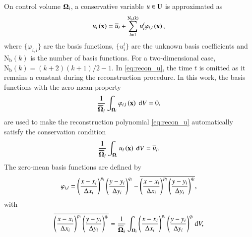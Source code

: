 On control volume $\mathbf{\Omega}_i$, a conservative variable $u \in \mathbf{U}$ is approximated as
\begin{equation}
    \label{eq:recon_u}
    u_i \left(\mathbf{x}\right)= \overline{u}_i + \sum^{\mathrm{N_b}\left(k\right)}_{l=1} u_i^l \varphi_{i,l} \left(\mathbf{x}\right),
\end{equation}
where $\{\varphi_{i,l}\}$ are the basis functions, $\{u^l_i\}$ are the unknown basis coefficients and $\mathrm{N_b}(k)$ is the number of basis functions. For a two-dimensional case, $\mathrm{N_b}(k)=  (k+2)(k+1)/2 -1$. In \eqref{eq:recon_u}, the time $t$ is omitted as it remains a constant during the reconstruction procedure.
In this work, the basis functions with the zero-mean property
\begin{equation}
    \frac{1}{\overline{\mathbf{\Omega}}_i} \int_{\mathbf{\Omega}_i} \varphi_{i,l} \left(\mathbf{x}\right) \ \dd V=0,
\end{equation}
are used to make the reconstruction polynomial \eqref{eq:recon_u} automatically satisfy the conservation condition
\begin{equation}
    \label{eq:zero-mean}
    \frac{1}{\overline{\mathbf{\Omega}}_i}\int_{\mathbf{\Omega}_i}u_i \left(\mathbf{x}\right)\ \dd V= \overline{u}_i.
\end{equation}
The zero-mean basis functions are defined by
\begin{equation}
    \varphi_{i,l} =
    \left(\frac{x - x_{i}}{\mathrm\Delta x_i}\right)^{p_l}
    \left(\frac{y - y_{i}}{\mathrm\Delta y_i}\right)^{q_l}
    -
    \overline{
        \left(\frac{x - x_{i}}{\mathrm\Delta x_i}\right)^{p_l}
        \left(\frac{y - y_{i}}{\mathrm\Delta y_i}\right)^{q_l}
    },
\end{equation}
with
\begin{equation}
    \overline{
        \left(\frac{x - x_{i}}{\mathrm\Delta x_i}\right)^{p_l}
        \left(\frac{y - y_{i}}{\mathrm\Delta y_i}\right)^{q_l}
    }= \dfrac{1}{\overline{\mathbf{\Omega}}_i}\int_{\mathbf{\Omega}_i}   \left(\frac{x - x_{i}}{\mathrm\Delta x_i}\right)^{p_l}
    \left(\frac{y - y_{i}}{\mathrm\Delta y_i}\right)^{q_l}  \dd V,
\end{equation}
